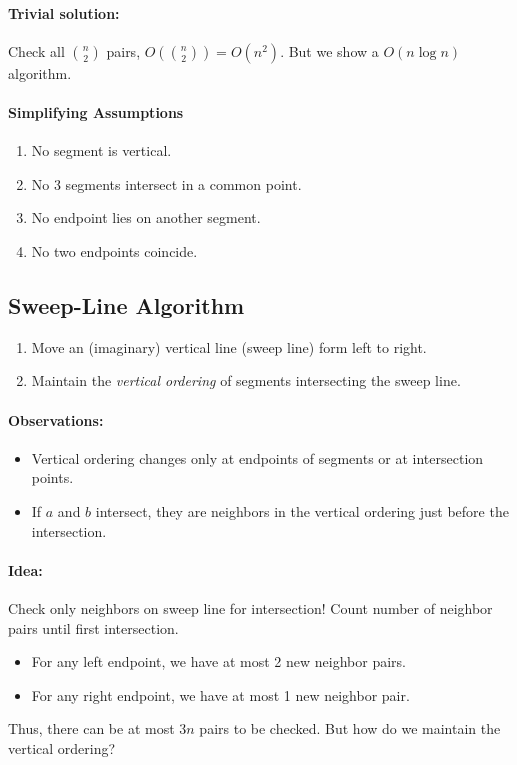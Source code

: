 \paragraph{Trivial solution:} Check all $n \choose 2$ pairs, $O({n \choose 2}) = O(n^2)$. But we show a $O(n \log n)$ algorithm.

\paragraph{Simplifying Assumptions}
\begin{enumerate}
	\item No segment is vertical.
	\item No 3 segments intersect in a common point.
	\item No endpoint lies on another segment.
	\item No two endpoints coincide. 
\end{enumerate}

\subsection{Sweep-Line Algorithm}

\begin{enumerate}
	\item Move an (imaginary) vertical line (sweep line) form left to right.
	\item Maintain the \emph{vertical ordering} of segments intersecting the sweep line.
\end{enumerate}

\paragraph{Observations:}
\begin{itemize}
	\item Vertical ordering changes only at endpoints of segments or at intersection points.
	\item If $a$ and $b$ intersect, they are neighbors in the vertical ordering just before the intersection.
\end{itemize}

\paragraph{Idea:} Check only neighbors on sweep line for intersection! Count number of neighbor pairs until first intersection.
\begin{itemize}
	\item For any left endpoint, we have at most 2 new neighbor pairs.
	\item For any right endpoint, we have at most 1 new neighbor pair.
\end{itemize}
Thus, there can be at most $3n$ pairs to be checked. But how do we maintain the vertical ordering?

